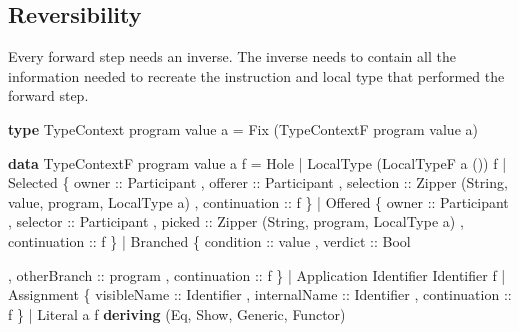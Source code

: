 \documentclass[runningheads]{llncs}
\newenvironment{Shaded}{}{}
\newcommand{\KeywordTok}[1]{\textcolor[rgb]{0.00,0.44,0.13}{\textbf{#1}}}
\newcommand{\DataTypeTok}[1]{\textcolor[rgb]{0.56,0.13,0.00}{#1}}
\newcommand{\OtherTok}[1]{\textcolor[rgb]{0.00,0.44,0.13}{#1}}
\newcommand{\FunctionTok}[1]{\textcolor[rgb]{0.02,0.16,0.49}{#1}}
\newcommand{\NormalTok}[1]{#1}
\begin{document}
\subsection{Reversibility}\label{reversibility}

Every forward step needs an inverse. The inverse needs to contain all
the information needed to recreate the instruction and local type that
performed the forward step.

\begin{Shaded}
\begin{Highlighting}[]
\KeywordTok{type} \DataTypeTok{TypeContext}\NormalTok{ program value a }\FunctionTok{=} 
    \DataTypeTok{Fix}\NormalTok{ (}\DataTypeTok{TypeContextF}\NormalTok{ program value a)}

\KeywordTok{data} \DataTypeTok{TypeContextF}\NormalTok{ program value a f }
    \FunctionTok{=} \DataTypeTok{Hole} 
    \FunctionTok{|} \DataTypeTok{LocalType}\NormalTok{ (}\DataTypeTok{LocalTypeF}\NormalTok{ a ()) f }
    \FunctionTok{|} \DataTypeTok{Selected} 
\NormalTok{        \{}\OtherTok{ owner ::} \DataTypeTok{Participant}
\NormalTok{        ,}\OtherTok{ offerer ::} \DataTypeTok{Participant} 
\NormalTok{        ,}\OtherTok{ selection ::} \DataTypeTok{Zipper}\NormalTok{ (}\DataTypeTok{String}\NormalTok{, value, program, }\DataTypeTok{LocalType}\NormalTok{ a)}
\NormalTok{        ,}\OtherTok{ continuation ::}\NormalTok{ f }
\NormalTok{        \}}
    \FunctionTok{|} \DataTypeTok{Offered} 
\NormalTok{        \{}\OtherTok{ owner ::} \DataTypeTok{Participant}
\NormalTok{        ,}\OtherTok{ selector ::} \DataTypeTok{Participant} 
\NormalTok{        ,}\OtherTok{ picked ::} \DataTypeTok{Zipper}\NormalTok{ (}\DataTypeTok{String}\NormalTok{, program, }\DataTypeTok{LocalType}\NormalTok{ a)}
\NormalTok{        ,}\OtherTok{ continuation ::}\NormalTok{ f }
\NormalTok{        \}}
    \FunctionTok{|} \DataTypeTok{Branched} 
\NormalTok{        \{}\OtherTok{ condition ::}\NormalTok{ value}
\NormalTok{        ,}\OtherTok{ verdict ::} \DataTypeTok{Bool}
   
\NormalTok{         ,}\OtherTok{ otherBranch ::}\NormalTok{ program}
\NormalTok{        ,}\OtherTok{ continuation ::}\NormalTok{ f }
\NormalTok{        \}}
    \FunctionTok{|} \DataTypeTok{Application} \DataTypeTok{Identifier} \DataTypeTok{Identifier}\NormalTok{ f }
    \FunctionTok{|} \DataTypeTok{Assignment} 
\NormalTok{        \{}\OtherTok{ visibleName ::} \DataTypeTok{Identifier}
\NormalTok{        ,}\OtherTok{ internalName ::} \DataTypeTok{Identifier}
\NormalTok{        ,}\OtherTok{ continuation ::}\NormalTok{ f }
\NormalTok{        \}}
    \FunctionTok{|} \DataTypeTok{Literal}\NormalTok{ a f}
    \KeywordTok{deriving}\NormalTok{ (}\DataTypeTok{Eq}\NormalTok{, }\DataTypeTok{Show}\NormalTok{, }\DataTypeTok{Generic}\NormalTok{, }\DataTypeTok{Functor}\NormalTok{)}
\end{Highlighting}
\end{Shaded}
\end{document}
